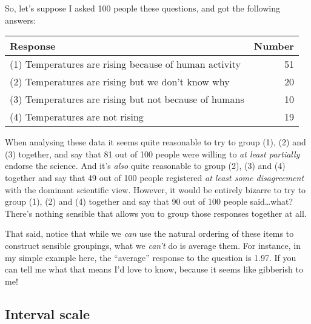 So, let's suppose I asked 100 people these questions, and got the following answers:

\vspace*{10pt}
\begin{tabular}{lr}
\hline
Response                                              & Number \\
\hline
(1) Temperatures are rising because of human activity & 51 \\
(2) Temperatures are rising but we don't know why     & 20 \\
(3) Temperatures are rising but not because of humans & 10 \\
(4) Temperatures are not rising                       & 19 \\
\hline
\end{tabular}
\vspace*{10pt}

\noindent
When analysing these data it seems quite reasonable to try to group (1), (2) and (3) together, and say that 81 out of 100 people were willing to {\it at least partially} endorse the science. And it's {\it also} quite reasonable to group (2), (3) and (4) together and say that 49 out of 100 people registered {\it at least some disagreement} with the dominant scientific view. However, it would be entirely bizarre to try to group (1), (2) and (4) together and say that 90 out of 100 people said\ldots what? There's nothing sensible that allows you to group those responses together at all.

That said, notice that while we {\it can} use the natural ordering of these items to construct sensible groupings, what we {\it can't} do is average them. For instance, in my simple example here, the ``average'' response to the question is 1.97. If you can tell me what that means I'd love to know, because it seems like gibberish to me!

\subsection{Interval scale}

